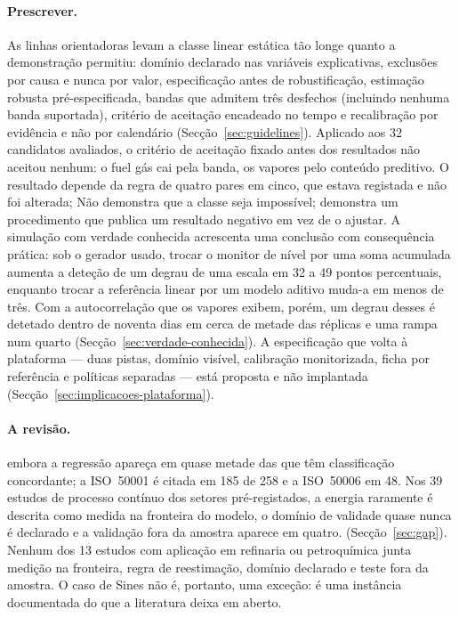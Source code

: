 \paragraph{Prescrever.} As linhas orientadoras levam a classe linear
estática tão longe quanto a demonstração permitiu: domínio declarado nas variáveis explicativas,
exclusões por causa e nunca por valor, especificação antes de robustificação,
estimação robusta pré-especificada, bandas que admitem três desfechos
(incluindo nenhuma banda suportada), critério de aceitação encadeado no
tempo e recalibração por evidência e não por calendário
(Secção~\ref{sec:guidelines}). Aplicado aos 32 candidatos avaliados, o
critério de aceitação fixado antes dos resultados não aceitou nenhum: o fuel
gás cai pela banda, os vapores pelo conteúdo preditivo. O resultado depende
da regra de quatro pares em cinco, que estava registada e não foi alterada;
Não demonstra que a classe seja impossível; demonstra um procedimento que
publica um resultado negativo em vez de o ajustar. A simulação com verdade
conhecida acrescenta uma conclusão com consequência prática: sob o gerador
usado, trocar o monitor de nível por uma soma acumulada aumenta a deteção de
um degrau de uma escala em 32 a 49 pontos percentuais, enquanto trocar a
referência linear por um modelo aditivo muda-a em menos de três. Com a
autocorrelação que os vapores exibem, porém, um degrau desses é detetado
dentro de noventa dias em cerca de metade das réplicas e uma rampa num
quarto (Secção~\ref{sec:verdade-conhecida}). A especificação que volta à
plataforma --- duas pistas, domínio visível, calibração monitorizada, ficha
por referência e políticas separadas --- está proposta e não implantada
(Secção~\ref{sec:implicacoes-plataforma}).

\paragraph{A revisão.}  embora a regressão apareça
em quase metade das que têm classificação concordante; a ISO~50001 é citada
em 185 de 258 e a ISO~50006 em 48. Nos 39 estudos de processo contínuo dos
setores pré-registados, a energia raramente é descrita como medida na
fronteira do modelo, o domínio de validade quase nunca é declarado e a
validação fora da amostra aparece em quatro. 
(Secção~\ref{sec:gap}). Nenhum dos 13 estudos com aplicação em refinaria ou
petroquímica junta medição na fronteira, regra de reestimação, domínio
declarado e teste fora da amostra. O caso de Sines não é, portanto, uma
exceção: é uma instância documentada do que a literatura deixa em aberto.

